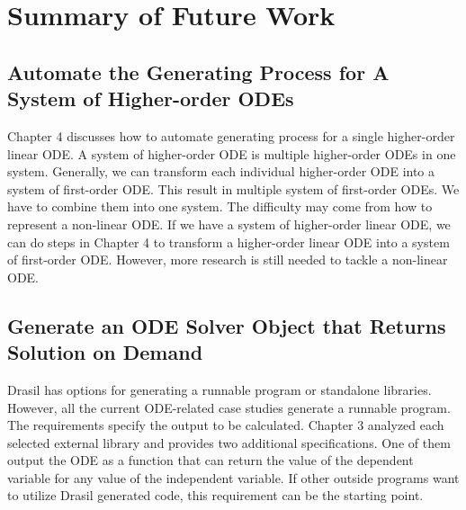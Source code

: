 \chapter{Summary of Future Work}

\section{Automate the Generating Process for A System of Higher-order ODEs}
Chapter 4 discusses how to automate generating process for a single higher-order linear ODE. A system of higher-order ODE is multiple higher-order ODEs in one system. Generally, we can transform each individual higher-order ODE into a system of first-order ODE. This result in multiple system of first-order ODEs. We have to combine them into one system. The difficulty may come from how to represent a non-linear ODE. If we have a system of higher-order linear ODE, we can do steps in Chapter 4 to transform a higher-order linear ODE into a system of first-order ODE. However, more research is still needed to tackle a non-linear ODE.

\section{Generate an ODE Solver Object that Returns Solution on Demand}
Drasil has options for generating a runnable program or standalone libraries. However, all the current ODE-related case studies generate a runnable program. The requirements specify the output to be calculated. Chapter 3 analyzed each selected external library and provides two additional specifications. One of them output the ODE as a function that can return the value of the dependent variable for any value of the independent variable. If other outside programs want to utilize Drasil generated code, this requirement can be the starting point.




